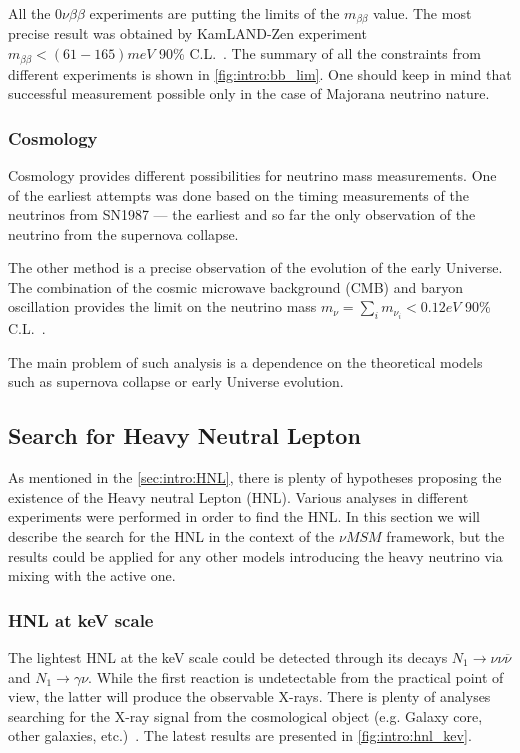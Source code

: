 \documentclass[../main.tex]{subfiles}
\begin{document}
All the $0\nu\beta\beta$ experiments are putting the limits of the $m_{\beta\beta}$ value. The most precise result was obtained by KamLAND-Zen experiment $m_{\beta\beta} < (61-165) meV$ 90\% C.L.~\cite{Gando2016}. The summary of all the constraints from different experiments is shown in \autoref{fig:intro:bb_lim}. One should keep in mind that successful measurement possible only in the case of Majorana neutrino nature.

\subsubsection{Cosmology}
Cosmology provides different possibilities for neutrino mass measurements. One of the earliest attempts was done based on the timing measurements of the neutrinos from SN1987 --- the earliest and so far the only observation of the neutrino from the supernova collapse.

The other method is a precise observation of the evolution of the early Universe. The combination of the cosmic microwave background (CMB) and baryon oscillation provides the limit on the neutrino mass $m_\nu=\sum_i m_{\nu_i}<0.12eV$ 90\% C.L.~\cite{Palanque-Delabrouille2015}.

The main problem of such analysis is a dependence on the theoretical models such as supernova collapse or early Universe evolution.

\subsection{Search for Heavy Neutral Lepton}
\label{sec:intro:HNL_exp}
As mentioned in the \autoref{sec:intro:HNL}, there is plenty of hypotheses proposing the existence of the Heavy neutral Lepton (HNL). Various analyses in different experiments were performed in order to find the HNL. In this section we will describe the search for the HNL in the context of the $\nu MSM$ framework, but the results could be applied for any other models introducing the heavy neutrino via mixing with the active one.

\subsubsection{HNL at keV scale}
The lightest HNL at the keV scale could be detected through its decays $N_1\to \nu\nu\overline{\nu}$ and $N_1\to\gamma\nu$. While the first reaction is undetectable from the practical point of view, the latter will produce the observable X-rays. There is plenty of analyses searching for the X-ray signal from the cosmological object (e.g. Galaxy core, other galaxies, etc.)~\cite{Ng2019, Perez2017}. The latest results are presented in \autoref{fig:intro:hnl_kev}.
\end{document}
